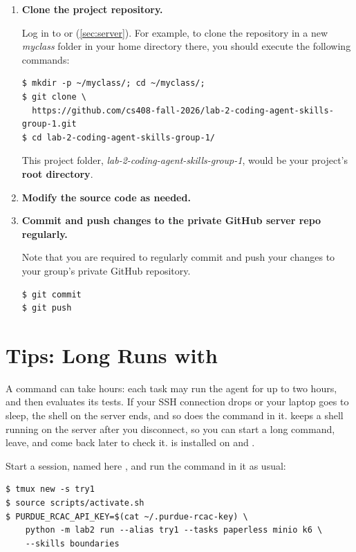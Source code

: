 \documentclass[letterpaper,11pt]{article}
\begin{document}
\begin{enumerate}

\item \textbf{Clone the project repository.}

Log in to  or  (\autoref{sec:server}).
For example, to clone the repository in a new \textit{myclass} folder in your home
directory there, you should execute the following commands:

{\small
\begin{verbatim}
$ mkdir -p ~/myclass/; cd ~/myclass/;
$ git clone \
  https://github.com/cs408-fall-2026/lab-2-coding-agent-skills-group-1.git
$ cd lab-2-coding-agent-skills-group-1/
\end{verbatim}
}

This project folder, \emph{lab-2-coding-agent-skills-group-1}, would be your
project's \textbf{root directory}.

\item \textbf{Modify the source code as needed.}

\item \textbf{Commit and push changes to the private GitHub server repo regularly.}

Note that you are required to regularly commit and push your changes to your group's private
GitHub repository.

\begin{verbatim}
$ git commit
$ git push
\end{verbatim}

\end{enumerate}

\section{Tips: Long Runs with \texorpdfstring{}{tmux}}
\label{sec:appx:tmux}

A  command can take hours: each task may run the agent for up to two
hours, and then evaluates its tests. If your SSH connection drops or your
laptop goes to sleep, the shell on the server ends, and so does the command
in it. \ic{tmux} keeps a shell running on the server after you
disconnect, so you can start a long command, leave, and come back later to
check it. \ic{tmux} is installed on \ic{dahj} and \ic{soji}.

Start a  session, named here , and run the command in it as
usual:

\begin{verbatim}
$ tmux new -s try1
$ source scripts/activate.sh
$ PURDUE_RCAC_API_KEY=$(cat ~/.purdue-rcac-key) \
    python -m lab2 run --alias try1 --tasks paperless minio k6 \
    --skills boundaries
\end{verbatim}
\end{document}
